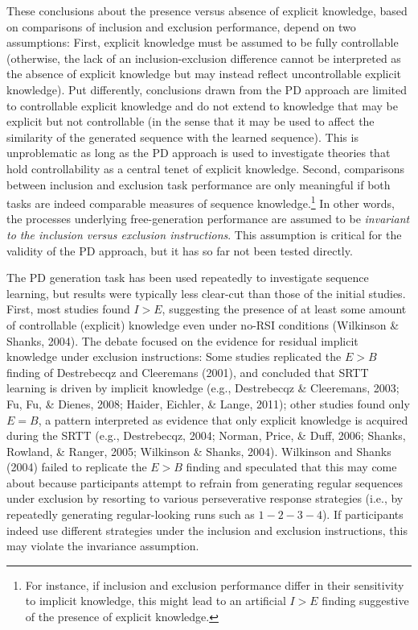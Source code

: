 \documentclass[english,,man]{apa6}
\begin{document}
These conclusions about the presence versus absence of explicit knowledge, based on comparisons of inclusion and exclusion performance, depend on two assumptions:
First, explicit knowledge must be assumed to be fully controllable (otherwise, the lack of an inclusion-exclusion difference cannot be interpreted as the absence of explicit knowledge but may instead reflect uncontrollable explicit knowledge).
Put differently, conclusions drawn from the PD approach are limited to controllable explicit knowledge and do not extend to knowledge that may be explicit but not controllable (in the sense that it may be used to affect the similarity of the generated sequence with the learned sequence).
This is unproblematic as long as the PD approach is used to investigate theories that hold controllability as a central tenet of explicit knowledge.
Second, comparisons between inclusion and exclusion task performance are only meaningful if both tasks are indeed comparable measures of sequence knowledge.\footnote{For instance, if inclusion and exclusion performance differ in their sensitivity to implicit knowledge, this might lead to an artificial \(I>E\) finding suggestive of the presence of explicit knowledge.}
In other words, the processes underlying free-generation performance are assumed to be \emph{invariant to the inclusion versus exclusion instructions}.
This assumption is critical for the validity of the PD approach, but it has so far not been tested directly.

The PD generation task has been used repeatedly to investigate sequence learning, but results were typically less clear-cut than those of the initial studies.
First, most studies found \(I>E\), suggesting the presence of at least some amount of controllable (explicit) knowledge even under no-RSI conditions (Wilkinson \& Shanks, 2004).
The debate focused on the evidence for residual implicit knowledge under exclusion instructions:
Some studies replicated the \(E > B\) finding of Destrebecqz and Cleeremans (2001), and concluded that SRTT learning is driven by implicit knowledge (e.g., Destrebecqz \& Cleeremans, 2003; Fu, Fu, \& Dienes, 2008; Haider, Eichler, \& Lange, 2011);
other studies found only \(E = B\), a pattern interpreted as evidence that only explicit knowledge is acquired during the SRTT (e.g., Destrebecqz, 2004; Norman, Price, \& Duff, 2006; Shanks, Rowland, \& Ranger, 2005; Wilkinson \& Shanks, 2004).
Wilkinson and Shanks (2004) failed to replicate the \(E > B\) finding and speculated that this may come about because participants attempt to refrain from generating regular sequences under exclusion by resorting to various perseverative response strategies
(i.e., by repeatedly generating regular-looking runs such as \(1{-}2{-}3{-}4\)).
If participants indeed use different strategies under the inclusion and exclusion instructions, this may violate the invariance assumption.
\end{document}
